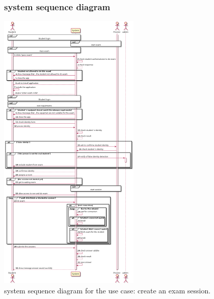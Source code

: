 \documentclass[]{uc2pfecaneva}
\begin{document}
\begin{figure}[]
	\subsubsection{system sequence diagram}
	\centering
	\includegraphics[width=0.6\textwidth]{images/pass_exam}
	
	\caption{system sequence diagram for the use case: create an exam session.}
\end{figure}
\clearpage
\end{document}
